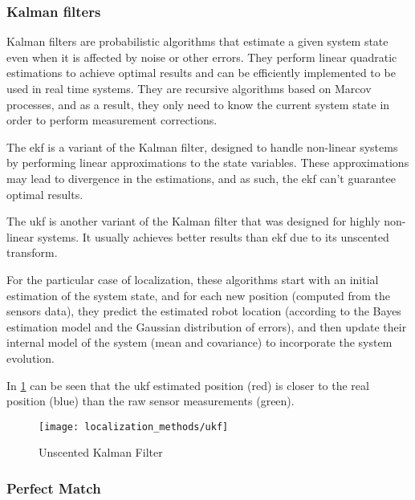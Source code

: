 \subsubsection{Kalman filters}

Kalman filters \cite{Kalman1960} are probabilistic algorithms that estimate a given system state even when it is affected by noise or other errors. They perform linear quadratic estimations to achieve optimal results and can be efficiently implemented to be used in real time systems. They are recursive algorithms based on Marcov processes, and as a result, they only need to know the current system state in order to perform measurement corrections.

The \gls{ekf} \cite{Einicke1999,Ribeiro2004,Ivanjko2010,Liu2011} is a variant of the Kalman filter, designed to handle non-linear systems by performing linear approximations to the state variables. These approximations may lead to divergence in the estimations, and as such, the \gls{ekf} can't guarantee optimal results.

The \gls{ukf} \cite{Julier1997,Wan2002} is another variant of the Kalman filter that was designed for highly non-linear systems. It usually achieves better results than \gls{ekf} due to its unscented transform.

For the particular case of localization, these algorithms start with an initial estimation of the system state, and for each new position (computed from the sensors data), they predict the estimated robot location (according to the Bayes estimation model and the Gaussian distribution of errors), and then update their internal model of the system (mean and covariance) to incorporate the system evolution.

In \cref{fig:localization-methods_ukf} can be seen that the \gls{ukf} estimated position (red) is closer to the real position (blue) than the raw sensor measurements (green).

\begin{figure}[H]
	\centering
	\texttt{[image: localization\_methods/ukf]}
	\caption[Unscented Kalman Filter]{Unscented Kalman Filter\protect\footnotemark}
	\label{fig:localization-methods_ukf}
\end{figure}


\subsubsection{Perfect Match}

